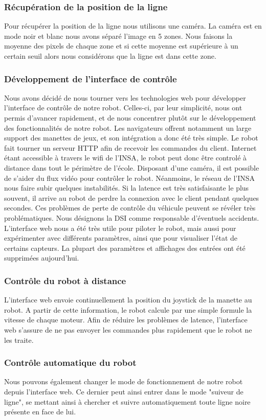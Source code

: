 \subsubsection*{Récupération de la position de la ligne}
Pour récupérer la position de la ligne nous utilisons une caméra. La caméra est en mode noir et blanc nous avons séparé l'image en 5 zones.
Nous faisons la moyenne des pixels de chaque zone et si cette moyenne est supérieure à un certain seuil alors nous considérons que la ligne est dans cette zone.



\subsubsection{Développement de l'interface de contrôle}
Nous avons décidé de nous tourner vers les technologies web pour développer l'interface de contrôle de notre robot. Celles-ci, par leur simplicité, nous ont permis d'avancer rapidement, et de nous concentrer plutôt sur le développement des fonctionnalités de notre robot. Les navigateurs offrent notamment un large support des manettes de jeux, et son intégration a donc été très simple.
Le robot fait tourner un serveur HTTP afin de recevoir les commandes du client. Internet étant accessible à travers le wifi de l'INSA, le robot peut donc être controlé à distance dans tout le périmètre de l'école. Disposant d'une caméra, il est possible de s'aider du flux vidéo pour contrôler le robot.
Néanmoins, le réseau de l'INSA nous faire subir quelques instabilités. Si la latence est très satisfaisante le plus souvent, il arrive au robot de perdre la connexion avec le client pendant quelques secondes. Ces problèmes de perte de contrôle du véhicule peuvent se révéler très problématiques. Nous désignons la DSI comme responsable d'éventuels accidents.
L'interface web nous a été très utile pour piloter le robot, mais aussi pour expérimenter avec différents paramètres, ainsi que pour visualiser l'état de certains capteurs. La plupart des paramètres et affichages des entrées ont été supprimées aujourd'hui.

\subsubsection*{Contrôle du robot à distance}
L'interface web envoie continuellement la position du joystick de la manette au robot. A partir de cette information, le robot calcule par une simple formule la vitesse de chaque moteur. Afin de réduire les problèmes de latence, l'interface web s'assure de ne pas envoyer les commandes plus rapidement que le robot ne les traite.

\subsubsection*{Contrôle automatique du robot}
Nous pouvons également changer le mode de fonctionnement de notre robot depuis l'interface web. Ce dernier peut ainsi entrer dans le mode "suiveur de ligne", se mettant ainsi à chercher et suivre automatiquement toute ligne noire présente en face de lui.